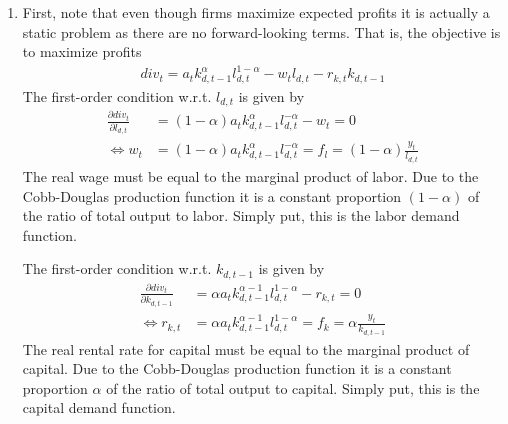 \begin{enumerate}
(I) and (III) in (IV) yields
\begin{align*}
\underbrace{\gamma c_t^{-1}}_{U_{c,t}} &= \beta E_t \underbrace{\gamma c_{t+1}^{-1}}_{U_{c,t+1}}\left(1 - \delta + r_{k,t+1}\right)
\end{align*}
This is the Euler equation of \textbf{intertemporal optimality}. It reflects the trade-off between consumption and savings.
If the household saves a (marginal) unit of consumption, i.e.\ invest this into the capital stock,
  she can consume \((1-\delta+r_{k,t+1})\) units in the following period.
The marginal utility of consuming a unit today is equal to \(U_{c,t}\),
  whereas consuming tomorrow has expected utility equal to \(E_t(U_{c,t+1})\).
Discounting expected marginal utility with \(\beta \), an optimum is characterized by a situation
  in which the household must be indifferent between both choices.

(I) in (II) yields:
\begin{align*}
w_t = -\frac{\frac{-\psi}{1-l_t}}{\gamma c_t^{-1}} \equiv - \frac{U_{l,t}}{U_{c,t}}
\end{align*}
This equation reflects \textbf{intratemporal optimality}; in other words, the labor supply function.
According to the equation, the real wage must be equal to the marginal rate of substitution between consumption and leisure.

\item First, note that even though firms maximize expected profits it is actually a static problem as there are no forward-looking terms.
That is, the objective is to maximize profits
\begin{align*}
{div}_t = a_t k_{d,t-1}^\alpha l_{d,t}^{1-\alpha} - w_t l_{d,t} - r_{k,t} k_{d,t-1}
\end{align*}
The first-order condition w.r.t.
\(l_{d,t}\) is given by
\begin{align*}
\frac{\partial {div}_t}{\partial l_{d,t}} &= (1-\alpha) a_t k_{d,t-1}^\alpha l_{d,t}^{-\alpha} - w_t = 0
\\
\Leftrightarrow w_t &= (1-\alpha) a_t k_{d,t-1}^\alpha l_{d,t}^{-\alpha} = f_l = (1-\alpha) \frac{y_t}{l_{d,t}}
\end{align*}
The real wage must be equal to the marginal product of labor.
Due to the Cobb-Douglas production function it is a constant proportion \((1-\alpha)\) of the ratio of total output to labor.
Simply put, this is the labor demand function.
				
The first-order condition w.r.t.
\(k_{d,t-1}\) is given by
\begin{align*}
\frac{\partial {div}_t}{\partial k_{d,t-1}} &= \alpha a_t k_{d,t-1}^{\alpha-1} l_{d,t}^{1-\alpha} - r_{k,t} = 0
\\
\Leftrightarrow r_{k,t} &= \alpha a_t k_{d,t-1}^{\alpha-1} l_{d,t}^{1-\alpha} = f_k = \alpha \frac{y_t}{k_{d,t-1}}
\end{align*}
The real rental rate for capital must be equal to the marginal product of capital.
Due to the Cobb-Douglas production function it is a constant proportion \(\alpha\) of the ratio of total output to capital.
Simply put, this is the capital demand function.


\end{enumerate}
